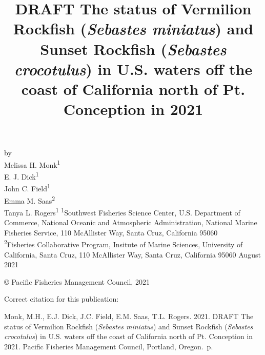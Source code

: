 \documentclass[11pt,
  english,
  a4paper,
]{article}
\date{}
\newcommand{\trTitle}{DRAFT The status of Vermilion Rockfish (\emph{Sebastes miniatus}) and Sunset Rockfish (\emph{Sebastes crocotulus}) in U.S. waters off the coast of California north of Pt. Conception in 2021}
\newcommand{\trYear}{2021}
\newcommand{\trMonth}{August}
\newcommand{\trAuthsBack}{Monk, M.H., E.J. Dick, J.C. Field, E.M. Saas, T.L. Rogers}
\newcommand{\trCitation}{
\begin{hangparas}{1em}{1}
\trAuthsBack{}. \trYear{}. \trTitle{}. Pacific Fisheries Management Council, Portland, Oregon. \pageref{LastPage}{}\,p.
\end{hangparas}}
\begin{document}

\renewcommand*{\thefootnote}{\fnsymbol{footnote}}

\small
\thispagestyle{empty}
\noindent
\begin{center}
\title{DRAFT The status of Vermilion Rockfish (\emph{Sebastes miniatus}) and Sunset Rockfish (\emph{Sebastes crocotulus}) in U.S. waters off the coast of California north of Pt. Conception in 2021}
\vspace{1.5cm}
{\Large\textbf{}}
\vfill
by\\
Melissa H. Monk\textsuperscript{1}\\
E. J. Dick\textsuperscript{1}\\
John C. Field\textsuperscript{1}\\
Emma M. Saas\textsuperscript{2}\\
Tanya L. Rogers\textsuperscript{1}\vfill
\textsuperscript{1}Southwest Fisheries Science Center, U.S. Department of Commerce, National Oceanic and Atmospheric Administration, National Marine Fisheries Service, 110 McAllister Way, Santa Cruz, California 95060\\
\textsuperscript{2}Fisheries Collaborative Program, Insitute of Marine Sciences, University of California, Santa Cruz, 110 McAllister Way, Santa Cruz, California 95060\vfill
\trMonth{} \trYear{}
\end{center}
\clearpage

\thispagestyle{empty}
\vspace*{\fill}
\begin{center}
\copyright{} Pacific Fisheries Management Council, \trYear{}\\
\end{center}
\par
\bigskip
\noindent
Correct citation for this publication:
\bigskip
\par
\trCitation{}
\clearpage


\tableofcontents\clearpage
\label{TRlastRoman}
\clearpage
\end{document}
